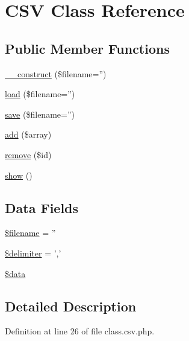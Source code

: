 \hypertarget{class_c_s_v}{\section{C\-S\-V Class Reference}
\label{class_c_s_v}
}
\subsection*{Public Member Functions}
\begin{DoxyCompactItemize}
\item 
\hyperlink{class_c_s_v_a14c84bb63122ad8fcb01df17afd63a1f}{\-\_\-\-\_\-construct} (\$filename='')
\item 
\hyperlink{class_c_s_v_ac3e60980a993f765445acea4e30bed73}{load} (\$filename='')
\item 
\hyperlink{class_c_s_v_a3a876f7e0ace40b48d9369e4855c498d}{save} (\$filename='')
\item 
\hyperlink{class_c_s_v_aa4de84fb89ac3c97fbaf4ad312bb47eb}{add} (\$array)
\item 
\hyperlink{class_c_s_v_a11f0aa9afc724ac4074e3ca127e79a2a}{remove} (\$id)
\item 
\hyperlink{class_c_s_v_a2b8e3779f5bd8c38f70307574859bd36}{show} ()
\end{DoxyCompactItemize}
\subsection*{Data Fields}
\begin{DoxyCompactItemize}
\item 
\hyperlink{class_c_s_v_a0722441477f957078ee2437054556cbc}{\$filename} = ''
\item 
\hyperlink{class_c_s_v_a40acc7b8c08cfbb456cd9444cb0e8f61}{\$delimiter} = ','
\item 
\hyperlink{class_c_s_v_a6efc15b5a2314dd4b5aaa556a375c6d6}{\$data}
\end{DoxyCompactItemize}


\subsection{Detailed Description}


Definition at line 26 of file class.\-csv.\-php.



